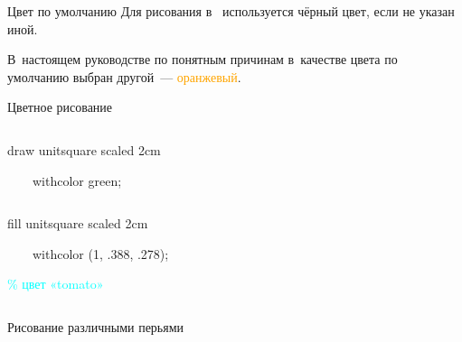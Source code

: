 \begin{frame}{Цвет по умолчанию}
\large
Для рисования в~ используется
\colorbox{fg}{\textcolor{bg}{чёрный}} цвет, если не указан иной.

В~настоящем руководстве по понятным причинам в~качестве цвета по умолчанию
выбран другой~— \textcolor{orange}{оранжевый}.
\end{frame}

\begin{frame}{Цветное рисование}
\begin{columns}
\centerline{}%
\begin{programlisting}
draw unitsquare scaled 2cm\par
~~~~\alert{withcolor green};
\end{programlisting}
\end{columns}
\bigskip
\begin{columns}
\centerline{}%
\begin{programlisting}
fill unitsquare scaled 2cm\par
~~~~\alert{withcolor (1, .388, .278)};\par
\textcolor{cyan}{\% цвет «tomato»}
\end{programlisting}
\end{columns}
\end{frame}

\begin{frame}{Рисование различными перьями}
\begin{columns}
\centerline{}%
{\LARGE{}}%
\end{columns}
\bigskip
\begin{columns}
\centerline{}%
{\LARGE{}}%
\end{columns}
\bigskip
\begin{columns}
\centerline{}%
{\LARGE{}}%
\end{columns}
\end{frame}

